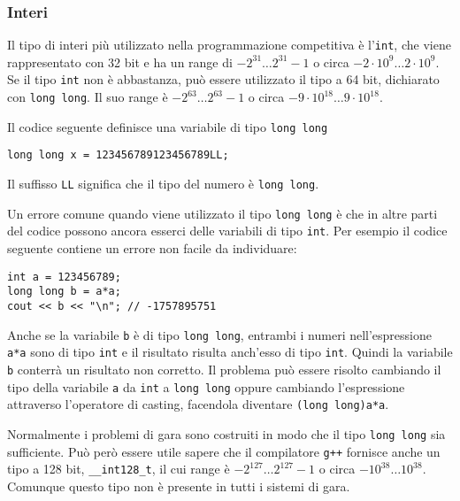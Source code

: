 
\subsubsection{Interi}

Il tipo di interi più utilizzato nella programmazione competitiva
è l'\texttt{int}, che viene rappresentato con 32 bit e ha un range di
$-2^{31} \ldots 2^{31}-1$ o circa $-2 \cdot 10^9 \ldots 2 \cdot 10^9$.
Se il tipo \texttt{int} non è abbastanza, 
può essere utilizzato il tipo a 64 bit, dichiarato con \texttt{long long}.
Il suo range è  $-2^{63} \ldots 2^{63}-1$ o circa
$-9 \cdot 10^{18} \ldots 9 \cdot 10^{18}$.

Il codice seguente definisce una variabile 
di tipo \texttt{long long} 

\begin{lstlisting}
long long x = 123456789123456789LL;
\end{lstlisting}

Il suffisso \texttt{LL} significa che il 
tipo del numero è \texttt{long long}.

Un errore comune quando viene utilizzato il tipo 
\texttt{long long} è che in altre parti del codice
possono ancora esserci delle variabili di tipo \texttt{int}.
Per esempio il codice seguente contiene un errore
non facile da individuare: 

\begin{lstlisting}
int a = 123456789;
long long b = a*a;
cout << b << "\n"; // -1757895751
\end{lstlisting}

Anche se la variabile \texttt{b} è di tipo \texttt{long long},
entrambi i numeri nell'espressione \texttt{a*a}
sono di tipo \texttt{int} e il risultato risulta
anch'esso di tipo \texttt{int}.
Quindi la variabile \texttt{b} conterrà
un risultato non corretto.
Il problema può essere risolto cambiando il tipo 
della variabile \texttt{a} da \texttt{int} a \texttt{long long}
oppure cambiando l'espressione attraverso l'operatore di casting,
facendola diventare \texttt{(long long)a*a}.

Normalmente i problemi di gara sono costruiti in modo
che il tipo \texttt{long long} sia sufficiente.
Può però essere utile sapere che il compilatore \texttt{g++}
fornisce anche un tipo a 128 bit, \texttt{\_\_int128\_t},
il cui range è $-2^{127} \ldots 2^{127}-1$ o circa
$-10^{38} \ldots 10^{38}$.
Comunque questo tipo non è presente in tutti i sistemi di gara.

